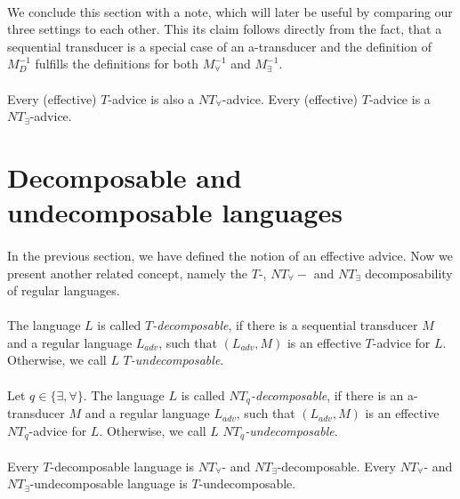 \paragraph{}
We conclude this section with a note, which will later be useful by comparing our three settings to each other. This its claim follows directly from the fact, that a sequential transducer is a special case of an a-transducer and the definition of $M^{-1}_{D}$ fulfills the definitions for both $M_{\forall}^{-1}$ and $M_{\exists}^{-1}$.

\paragraph{}
\poznamka Every (effective) $T$-advice is also a $NT_{\forall}$-advice. Every (effective) $T$-advice is a $NT_{\exists}$-advice.

\section{Decomposable and undecomposable languages}

\paragraph{}
In the previous section, we have defined the notion of an effective advice. Now we present another related concept, namely the $T$-, $NT_{\forall}-$ and $NT_{\exists}$ decomposability of regular languages.

\paragraph{}
\cdefinicia The language $L$ is called \emph{$T$-decomposable}, if there is a sequential transducer $M$ and a regular language $L_{adv}$, such that $(L_{adv}, M)$ is an effective $T$-advice for $L$. Otherwise, we call $L$ \emph{$T$-undecomposable}.

\paragraph{}
\cdefinicia Let $q \in \{\exists,\forall\}$. The language $L$ is called \emph{$NT_{q}$-decomposable}, if there is an a-transducer $M$ and a regular language $L_{adv}$, such that $(L_{adv}, M)$ is an effective $NT_q$-advice for $L$. Otherwise, we call $L$ \emph{$NT_q$-undecomposable}.

\paragraph{}
\clema Every $T$-decomposable language is $NT_{\forall}$- and $NT_{\exists}$-decomposable. Every $NT_{\forall}$- and $NT_{\exists}$-undecomposable language is $T$-undecomposable.

